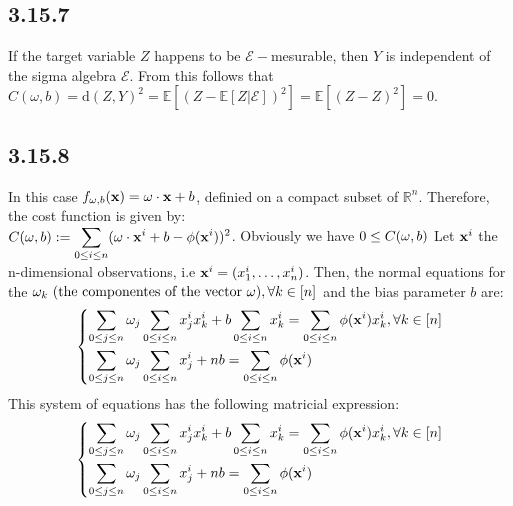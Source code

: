 \documentclass{exam}
\begin{document}
\subsection*{3.15.7}
If the target variable $Z$ happens to be $\mathcal{E}-$mesurable, then $Y$ is independent of the sigma algebra $\mathcal{E}$. From this follows that $C(\omega, b) = \text{d}(Z,Y)^2 = \mathbb{E} \left[ (Z - \mathbb{E}\left[ Z |\mathcal{E} \right] )^2\right]  = \mathbb{E} \left[ (Z - Z)^2\right] = 0$.

\subsection*{3.15.8}
In this case $ \displaystyle f_{\tiny \bold{\omega}, b}(\bold{x}) = \bold{\omega} \cdot \bold{x} + b$, definied on a compact subset of $\mathbb{R}^n$. Therefore, the cost function is given by: \\[0.25 em]
$C(\bold{\omega}, b) := \displaystyle \sum_{\tiny 0 \leq i\leq n } ( \bold{\omega} \cdot \bold{x}^{i} + b - \phi(\bold{x}^{i}))^{2}$. Obviously we have $0 \leq C(\bold{\omega}, b)$ Let $\bold{x}^{i}$ the n-dimensional observations, i.e $\bold{x}^{i}= (x_{1}^{i}, \ldots, x_{n}^{i})$. Then, the normal equations for the $\omega_k \text{ (the componentes of the vector $\bold{\omega}$)}, \forall k \in \left[n\right]$ and 
the bias parameter $b$ are:\\
\begin{equation}
        \left\{
        \begin{aligned}
                \displaystyle\sum_{\tiny 0 \leq j\leq n } \omega_j &\sum_{\tiny 0 \leq i\leq n } x^{i}_{j} x^{i}_{k}  +  b \sum_{\tiny 0 \leq i\leq n }  x^{i}_k = \displaystyle\sum_{\tiny 0 \leq i\leq n }\phi(\bold{x}^{i}) x^{i}_{k}, \forall k \in \left[n\right] \\
                \displaystyle\sum_{\tiny 0 \leq j \leq n }\omega_j &\sum_{\tiny 0 \leq i \leq n }x^{i}_{j} + nb = \displaystyle\sum_{\tiny 0 \leq i\leq n }\phi(\bold{x}^{i})
        \end{aligned}
        \right.
\end{equation}
This system of equations has the following matricial expression:\\
\begin{equation}
    \left\{
    \begin{aligned}
            \displaystyle\sum_{\tiny 0 \leq j\leq n } \omega_j &\sum_{\tiny 0 \leq i\leq n } x^{i}_{j} x^{i}_{k}  +  b \sum_{\tiny 0 \leq i\leq n }  x^{i}_k = \displaystyle\sum_{\tiny 0 \leq i\leq n }\phi(\bold{x}^{i}) x^{i}_{k}, \forall k \in \left[n\right] \\
            \displaystyle\sum_{\tiny 0 \leq j \leq n }\omega_j &\sum_{\tiny 0 \leq i \leq n }x^{i}_{j} + nb = \displaystyle\sum_{\tiny 0 \leq i\leq n }\phi(\bold{x}^{i})
    \end{aligned}
    \right.
\end{equation}
\end{document}
